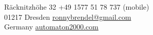 \color{header-blue}

	\section*{\Huge \name}

	R\"acknitzh\"ohe 32 \hfill +49 1577 51 78 737 (mobile)\\
	01217 Dresden \hfill \href{mailto:ronnybrendel@gmail.com}{ronnybrendel@gmail.com}\\
	Germany \hfill \href{http://automaton2000.com}{automaton2000.com}

\color{black}

\vspace{0.6cm}
